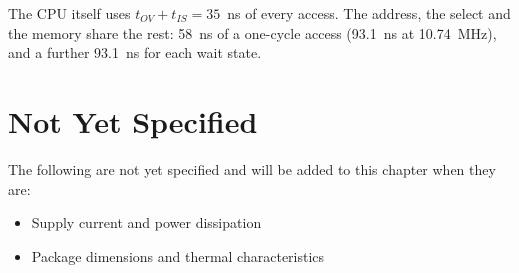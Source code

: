 \noindent The CPU itself uses $t_{OV} + t_{IS} = 35$~ns of every access. The address, the select and the memory share the
rest: 58~ns of a one-cycle access (93.1~ns at 10.74~MHz), and a further 93.1~ns for each wait state.

\section{Not Yet Specified}

The following are not yet specified and will be added to this chapter when they are:

\begin{itemize}
	\item Supply current and power dissipation
	\item Package dimensions and thermal characteristics
\end{itemize}
